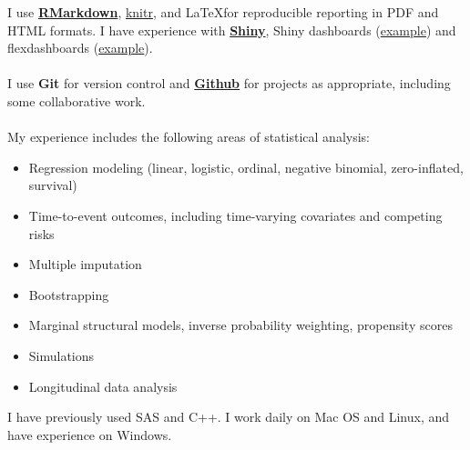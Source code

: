 \documentclass[5pt]{article}
\begin{document}
\noindent I use \textbf{\href{http://rmarkdown.rstudio.com}{RMarkdown}}, \href{https://yihui.name/knitr/}{knitr}, and \LaTeX  for reproducible reporting in PDF and HTML formats. I have experience with \textbf{\href{https://shiny.rstudio.com/}{Shiny}}, Shiny dashboards (\href{https://jenniferthompson.shinyapps.io/shinydashboard-medicared/}{example}) and flexdashboards (\href{https://jenthompson.me/2018/02/09/flexdashboards-monitoring/}{example}).
\\\\
\noindent I use \textbf{Git} for version control and \textbf{\href{https://github.com/jenniferthompson}{Github}} for projects as appropriate, including some collaborative work.
\\\\
\noindent My experience includes the following areas of statistical analysis:
\begin{itemize}
\item Regression modeling (linear, logistic, ordinal, negative binomial, zero-inflated, survival)
\item Time-to-event outcomes, including time-varying covariates and competing risks
\item Multiple imputation
\item Bootstrapping
\item Marginal structural models, inverse probability weighting, propensity scores
\item Simulations
\item Longitudinal data analysis
\end{itemize}

\noindent I have previously used SAS and C++. I work daily on Mac OS and Linux, and have experience on Windows.
\end{document}
